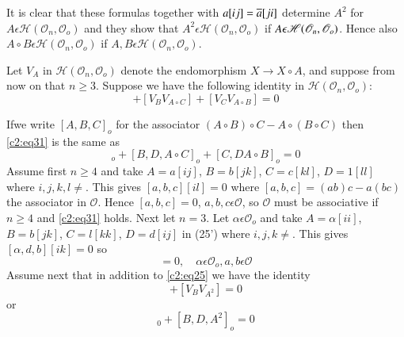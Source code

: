 It is clear that these formulas together with $a[ij]=\overline{a}[ji]$
determine $A^{2}$ for $A\epsilon
\mathscr{H}(\mathscr{O}_n,\mathscr{O}_o)$ and they show that
$A^{2}\epsilon \mathscr{H}(\mathscr{O}_n, \mathscr{O}_o)$ if
$A\epsilon \mathscr{H}(\mathscr{O}_n,\break \mathscr{O}_o)$. Hence also
$A\circ B\epsilon \mathscr{H}(\mathscr{O}_n, \mathscr{O}_o)$ if
$A,B\epsilon \mathscr{H}(\mathscr{O}_n, \mathscr{O}_o)$.

Let $V_A$ in $\mathscr{H}(\mathscr{O}_n, \mathscr{O}_o)$ denote the
endomorphism $X\to X\circ A$, and suppose from now on that $n\ge
3$. Suppose we have the following identity in
$\mathscr{H}(\mathscr{O}_n, \mathscr{O}_o)$:
\begin{equation*}
  [V_A, V_{B\circ C}]+[V_BV_{A\circ C}]+[V_CV_{A\circ B}]=0\tag{31}\label{c2:eq31}
\end{equation*}

If\pageoriginale we write $[A,B,C]_o$ for the associator $(A\circ
B)\circ C-A\circ (B\circ C)$ then \eqref{c2:eq31} is the same as 
\begin{equation*}
[A,D,B\circ C]_o+[B,D,A\circ C]_o+[C,D A\circ B]_o=0\tag{$31'$}
\end{equation*}
Assume first $n\geq 4$ and take $A=a[ij]$, $B=b[jk]$, $C=c[kl]$,
$D=1[ll]$ where $i,j,k,l\neq$. This gives $[a,b,c][il]=0$ where
$[a,b,c]=(ab)c-a(bc)$ the associator in $\mathscr{O}$. Hence
$[a,b,c]=0$, $a,b,c\epsilon \mathscr{O}$, so $\mathscr{O}$ must be
associative if $n\geq 4$ and \eqref{c2:eq31} holds. Next let $n=3$. Let
$\alpha\epsilon \mathscr{O}_o$ and take $A=\alpha[ii]$, $B=b[jk]$,
$C=l[kk]$, $D=d[ij]$ in (25') where $i,j,k\neq$. This gives $[\alpha,
  d,b][ik]=0$ so
\begin{equation*}
[\alpha, a,b]=0,\quad \alpha\epsilon \mathscr{O}_o,a,b\epsilon
\mathscr{O}\tag{32}\label{c2:eq32}
\end{equation*}
Assume next that in addition to \eqref{c2:eq25} we have the identity
\begin{equation*}
  [V_AV_{A\circ B}]+[V_BV_{A^{2}}]=0\tag{33}
\end{equation*}
or
\begin{equation*}
  [A,D.A\circ B]_0+[B,D,A^{2}]_o=0\tag{33'}
\end{equation*}

